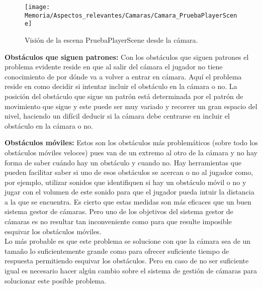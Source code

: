 \clearpage
\begin{figure}[h]
\texttt{[image: Memoria/Aspectos\_relevantes/Camaras/Camara\_PruebaPlayerScene]}
\caption{Visión de la escena PruebaPlayerScene desde la cámara.}
\end{figure}

\textbf{Obstáculos que siguen patrones:} Con los obstáculos que siguen patrones el problema evidente reside en que al salir del cámara el jugador no tiene conocimiento de por dónde va a volver a entrar en cámara. Aquí el problema reside en como decidir si intentar incluir el obstáculo en la cámara o no.
La posición del obstáculo que sigue un patrón está determinada por el patrón de movimiento que sigue y este puede ser muy variado y recorrer un gran espacio del nivel, haciendo un difícil deducir si la cámara debe centrarse en incluir el obstáculo en la cámara o no.

\textbf{Obstáculos móviles:} Estos son los obstáculos más problemáticos (sobre todo los obstáculos móviles veloces) pues van de un extremo al otro de la cámara y no hay forma de saber cuándo hay un obstáculo y cuando no. Hay herramientas que pueden facilitar saber si uno de esos obstáculos se acercan o no al jugador como, por ejemplo, utilizar sonidos que identifiquen si hay un obstáculo móvil o no y jugar con el volumen de este sonido para que el jugador pueda intuir la distancia a la que se encuentra. Es cierto que estas medidas son más eficaces que un buen sistema gestor de cámaras. Pero uno de los objetivos del sistema gestor de cámaras es no resultar tan inconveniente como para que resulte imposible esquivar los obstáculos móviles.\\
Lo más probable es que este problema se solucione con que la cámara sea de un tamaño lo suficientemente grande como para ofrecer suficiente tiempo de respuesta permitiendo esquivar los obstáculos. Pero en caso de no ser suficiente igual es necesario hacer algún cambio sobre el sistema de gestión de cámaras para solucionar este posible problema.

